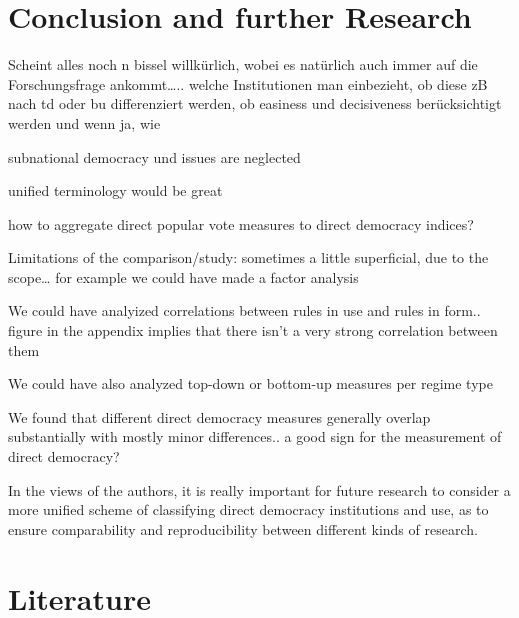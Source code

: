 \documentclass{systats}
\begin{document}
\section{Conclusion and further Research} \label{conclusion}



Scheint alles noch n bissel willkürlich, wobei es natürlich auch immer auf die Forschungsfrage ankommt….. welche Institutionen man einbezieht, ob diese zB nach td oder bu differenziert werden, ob easiness und decisiveness berücksichtigt werden und wenn ja, wie

subnational democracy und issues are neglected

unified terminology would be great

how to aggregate direct popular vote measures to direct democracy indices?

Limitations of the comparison/study: sometimes a little superficial, due to the scope… for example we could have made a factor analysis

We could have analyized correlations between rules in use and rules in form.. figure in the appendix implies that there isn’t a very strong correlation between them

We could have also analyzed top-down or bottom-up measures per regime type

We found that different direct democracy measures generally overlap substantially with mostly minor differences.. a good sign for the measurement of direct democracy?

In the views of the authors, it is really important for future research to consider a more unified scheme of classifying direct democracy institutions and use, as to ensure comparability and reproducibility between different kinds of research.




\clearpage
\thispagestyle{empty}
\section{Literature}



\clearpage
\newpage
\end{document}
